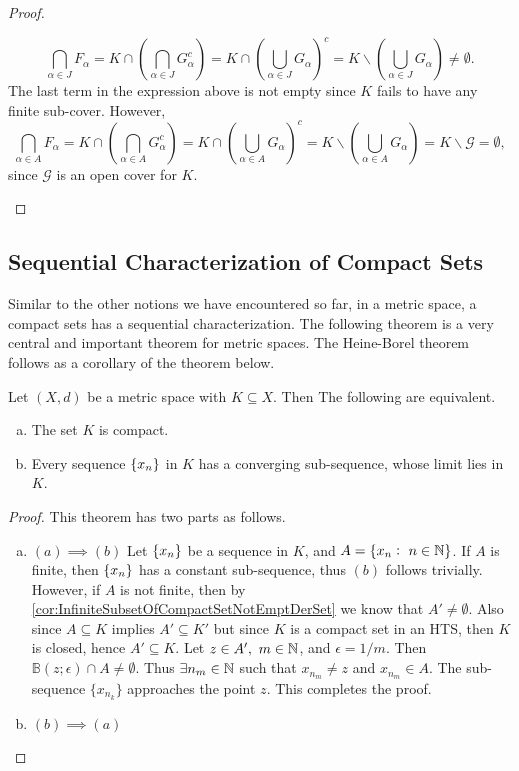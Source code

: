 \begin{proof}
\begin{itemize}
\begin{itemize}
			\[ \bigcap_{\alpha \in J} F_\alpha = K \cap (\bigcap_{\alpha\in J} G_\alpha^c) = K \cap (\bigcup_{\alpha\in J} G_\alpha)^c =  K \backslash (\bigcup_{\alpha\in J} G_\alpha) \neq \emptyset.  \]
			The last term in the expression above is not empty since $K$ fails to have any finite sub-cover. However, 
			\[ \bigcap_{\alpha \in A} F_\alpha = K \cap (\bigcap_{\alpha\in A} G_\alpha^c) = K \cap (\bigcup_{\alpha\in A} G_\alpha)^c =  K \backslash (\bigcup_{\alpha\in A} G_\alpha) =  K \backslash \mathcal{G} = \emptyset,  \]
			since $\mathcal{G}$ is an open cover for $K$.
		\end{itemize}
	\end{itemize}
\end{proof}


\subsection{Sequential Characterization of Compact Sets}

Similar to the other notions we have encountered so far, in a metric space, a compact sets has a sequential characterization. The following theorem is a very central and important theorem for metric spaces. The Heine-Borel theorem follows as a corollary of the theorem below.

\begin{theorem}
	Let $(X,d)$ be a metric space with $K \subseteq X$. Then The following are equivalent.
	\begin{enumerate}[(a)]
		\item The set $K$ is compact.
		\item Every sequence $\{x_n\}$ in $K$ has a converging sub-sequence, whose limit lies in $K$.
	\end{enumerate}
\end{theorem}
\begin{proof}
	This theorem has two parts as follows.
	\begin{enumerate}[(a)]
		\item $(a) \implies (b)$ Let $\{x_n\}$ be a sequence in $K$, and $A = \{ x_n:\ n\in\mathbb{N} \}$. If $A$ is finite, then $\{x_n\}$ has a constant sub-sequence, thus $(b)$ follows trivially. However, if $A$ is not finite, then by \autoref{cor:InfiniteSubsetOfCompactSetNotEmptDerSet} we know that $A' \neq \emptyset$. Also since $A \subseteq K$ implies $A' \subseteq K'$ but since $K$ is a compact set in an HTS, then $K$ is closed, hence $A' \subseteq K$. Let $z \in A',\ m \in \mathbb{N}$, and $\epsilon=1/m$. Then $\mathbb{B}(z;\epsilon) \cap A \neq \emptyset$. Thus $\exists n_m \in \mathbb{N}$ such that $x_{n_m}\neq z$ and $x_{n_m} \in A$. The sub-sequence $\{x_{n_k}\}$ approaches the point $z$. This completes the proof.
		\item $(b) \implies (a)$
	\end{enumerate}
\end{proof}

